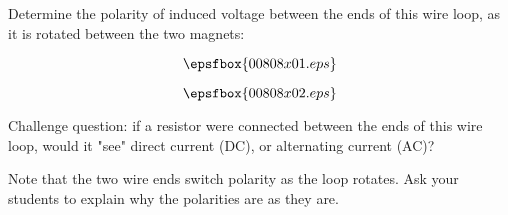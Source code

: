

Determine the polarity of induced voltage between the ends of this wire loop, as it is rotated between the two magnets:

$$\epsfbox{00808x01.eps}$$







$$\epsfbox{00808x02.eps}$$

\vskip 10pt

Challenge question: if a resistor were connected between the ends of this wire loop, would it "see" direct current (DC), or alternating current (AC)?







Note that the two wire ends switch polarity as the loop rotates.  Ask your students to explain why the polarities are as they are.




